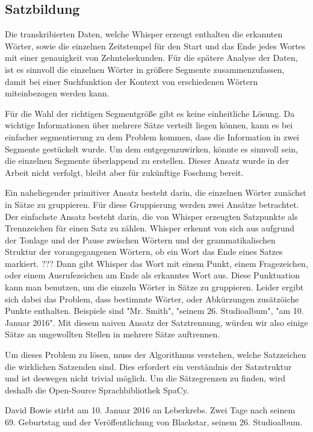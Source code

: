 \subsection{Satzbildung}

Die transkribierten Daten, welche Whisper erzeugt enthalten die erkannten Wörter, sowie die einzelnen Zeitstempel für den Start und das Ende jedes Wortes mit einer genauigkeit von Zehntelsekunden.
Für die spätere Analyse der Daten, ist es sinnvoll die einzelnen Wörter in größere Segmente zusammenzufassen, damit bei einer Suchfunktion der Kontext von erschiedenen Wörtern miteinbezogen werden kann.

Für die Wahl der richtigen Segmentgröße gibt es keine einheitliche Lösung.
Da wichtige Informationen über mehrere Sätze verteilt liegen können, kann es bei einfacher segmentierung zu dem Problem kommen, dass die Information in zwei Segmente gestückelt wurde.
Um dem entgegenzuwirken, könnte es sinnvoll sein, die einzelnen Segmente überlappend zu erstellen.
Dieser Ansatz wurde in der Arbeit nicht verfolgt, bleibt aber für zukünftige Foschung bereit.

Ein naheliegender primitiver Ansatz besteht darin, die einzelnen Wörter zunächst in Sätze zu gruppieren.
Für diese Gruppierung werden zwei Ansätze betrachtet.
Der einfachste Ansatz besteht darin, die von Whisper erzeugten Satzpunkte als  Trennzeichen für einen Satz zu zählen.
Whisper erkennt von sich aus aufgrund der Tonlage und der Pause zwischen Wörtern und der grammatikalischen Struktur der vorangegangenen Wörtern, ob ein Wort das Ende eines Satzes markiert. ???
Dann gibt Whisper das Wort mit einem Punkt, einem Fragezeichen, oder einem Ausrufezeichen am Ende als erkanntes Wort aus.
Diese Punktuation kann man benutzen, um die einzeln Wörter in Sätze zu gruppieren.
Leider ergibt sich dabei das Problem, dass bestimmte Wörter, oder Abkürzungen zusätzöiche Punkte enthalten.
Beispiele sind "Mr. Smith", "seinem 26. Studioalbum", "am 10. Januar 2016".
Mit diesem naiven Ansatz der Satztrennung, würden wir also einige Sätze an ungewollten Stellen in mehrere Sätze auftrennen.

Um dieses Problem zu lösen, muss der Algorithmus verstehen, welche Satzzeichen die wirklichen Satzenden sind.
Dies erfordert ein verständnis der Satzstruktur und ist deswegen nicht trivial möglich.
Um die Sätzegrenzen zu finden, wird deshalb die Open-Source Sprachbibliothek SpaCy.\cite{honnibal2017}

David Bowie stirbt am 10. Januar 2016 an Leberkrebs.
Zwei Tage nach seinem 69. Geburtstag und der Veröffentlichung von Blackstar, seinem 26. Studioalbum.

